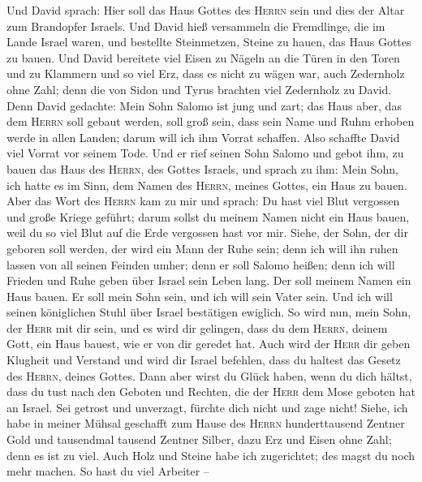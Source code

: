  Und David sprach: Hier soll das Haus Gottes des
\textsc{Herrn} sein und dies der Altar zum Brandopfer Israels.
 Und David hieß versammeln die Fremdlinge, die im Lande
Israel waren, und bestellte Steinmetzen, Steine zu hauen, das Haus
Gottes zu bauen.  Und David bereitete viel Eisen zu Nägeln
an die Türen in den Toren und zu Klammern und so viel Erz, dass es nicht
zu wägen war,  auch Zedernholz ohne Zahl; denn die von
Sidon und Tyrus brachten viel Zedernholz zu David.  Denn
David gedachte: Mein Sohn Salomo ist jung und zart; das Haus aber, das
dem \textsc{Herrn} soll gebaut werden, soll groß sein, dass sein Name
und Ruhm erhoben werde in allen Landen; darum will ich ihm Vorrat
schaffen. Also schaffte David viel Vorrat vor seinem Tode.
 Und er rief seinen Sohn Salomo und gebot ihm, zu bauen
das Haus des \textsc{Herrn}, des Gottes Israels,  und
sprach zu ihm: Mein Sohn, ich hatte es im Sinn, dem Namen des
\textsc{Herrn}, meines Gottes, ein Haus zu bauen.  Aber
das Wort des \textsc{Herrn} kam zu mir und sprach: Du hast viel Blut
vergossen und große Kriege geführt; darum sollst du meinem Namen nicht
ein Haus bauen, weil du so viel Blut auf die Erde vergossen hast vor
mir.  Siehe, der Sohn, der dir geboren soll werden, der
wird ein Mann der Ruhe sein; denn ich will ihn ruhen lassen von all
seinen Feinden umher; denn er soll Salomo heißen; denn ich will Frieden
und Ruhe geben über Israel sein Leben lang.  Der soll
meinem Namen ein Haus bauen. Er soll mein Sohn sein, und ich will sein
Vater sein. Und ich will seinen königlichen Stuhl über Israel bestätigen
ewiglich.  So wird nun, mein Sohn, der \textsc{Herr} mit
dir sein, und es wird dir gelingen, dass du dem \textsc{Herrn}, deinem
Gott, ein Haus bauest, wie er von dir geredet hat.  Auch
wird der \textsc{Herr} dir geben Klugheit und Verstand und wird dir
Israel befehlen, dass du haltest das Gesetz des \textsc{Herrn}, deines
Gottes.  Dann aber wirst du Glück haben, wenn du dich
hältst, dass du tust nach den Geboten und Rechten, die der \textsc{Herr}
dem Mose geboten hat an Israel. Sei getrost und unverzagt, fürchte dich
nicht und zage nicht!  Siehe, ich habe in meiner Mühsal
geschafft zum Hause des \textsc{Herrn} hunderttausend Zentner Gold und
tausendmal tausend Zentner Silber, dazu Erz und Eisen ohne Zahl; denn es
ist zu viel. Auch Holz und Steine habe ich zugerichtet; des magst du
noch mehr machen.  So hast du viel Arbeiter --
